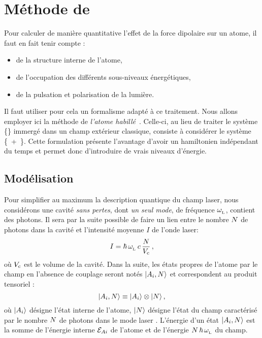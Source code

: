 \section{Méthode de }
Pour calculer de manière quantitative l'effet de la force dipolaire sur un atome, il faut en fait tenir compte :
\begin{itemize}
	\item de la structure interne de l'atome, 
	\item de l'occupation des différents sous-niveaux énergétiques,
	\item de la pulsation et polarisation de la lumière.
\end{itemize}
Il faut utiliser pour cela un formalisme adapté à ce traitement. Nous allons employer ici la méthode de \emph{l'atome habillé}~\cite{CDG98}. Celle-ci, au lieu de traiter le système \{\} immergé dans un champ extérieur classique, consiste à considérer le système \{~+~\}. Cette formulation présente l'avantage d'avoir un hamiltonien indépendant du temps et permet donc d'introduire de vrais niveaux d'énergie.

\subsection{Modélisation}
Pour simplifier au maximum la description quantique du champ laser, nous considérons une cavité \emph{sans pertes}, dont \emph{un seul mode}, de fréquence $\pulsLaser$, contient des photons. Il sera par la suite possible de faire un lien entre le nombre $\Nph$ de photons dans la cavité et l'intensité moyenne $I$ de l'onde laser:
\begin{equation}
	I = \hbar \, \pulsLaser \, c \, \frac{\Nph}{\Vcav}
	\virguleformule
	\label{eq:IlaserNphotons}
\end{equation}
où $\Vcav$ est le volume de la cavité. 
Dans la suite, les états propres de l'atome  par le champ en l'absence de couplage seront notés $\Ket{\AiN}$ et correspondent au produit tensoriel :
\begin{equation}
\Ket{\AiN} \equiv \Ket{A_i} \otimes \Ket{\Nph}
\virguleformule
	\label{eq:KetAiN}
\end{equation}
où $\Ket{A_i}$ désigne l'état interne de l'atome, $\Ket{\Nph}$ désigne l'état du champ caractérisé par le nombre $\Nph$ de photons dans le mode laser%
.
L'énergie d'un état $\Ket{\AiN}$ est la somme de l'énergie interne $\Ener_{Ai}$ de l'atome et de l'énergie $\Nph\,\hbar\,\pulsLaser$ du champ.



